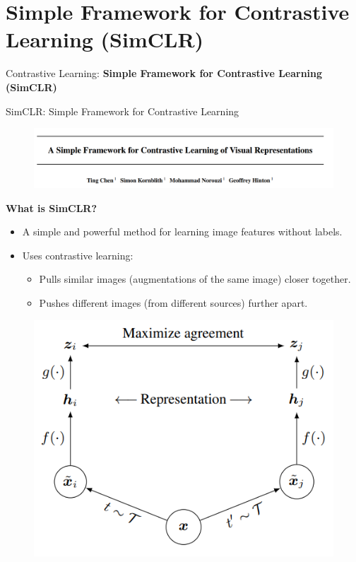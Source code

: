 \section{Simple Framework for Contrastive Learning (SimCLR)}
\begin{frame}{}
    \LARGE Contrastive Learning: \textbf{Simple Framework for Contrastive Learning (SimCLR)}
\end{frame}

\begin{frame}[allowframebreaks]{SimCLR: Simple Framework for Contrastive Learning}
\begin{figure}
    \centering
    \includegraphics[width=\linewidth,height=0.9\textheight,keepaspectratio]{images/contrastive/slide_72_1_img.png}
\end{figure}

\framebreak

\textbf{What is SimCLR?}
\begin{itemize}
    \item A simple and powerful method for learning image features without labels.
    \item Uses contrastive learning:
    \begin{itemize}
        \item Pulls similar images (augmentations of the same image) closer together.
        \item Pushes different images (from different sources) further apart.
    \end{itemize}
\end{itemize}

\framebreak

\begin{figure}
    \centering
    \includegraphics[width=\linewidth,height=0.9\textheight,keepaspectratio]{images/contrastive/slide_73_1_img.png}
\end{figure}


\end{frame}
